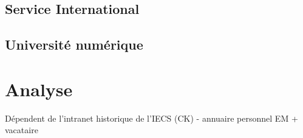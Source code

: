 \documentclass{book}
\begin{document}
\section{Service International}

\section{Université numérique}



\chapter{Analyse}


Dépendent de l'intranet historique de l'IECS (CK)
- annuaire personnel EM + vacataire




\appendix
%
\printindex
\end{document}

